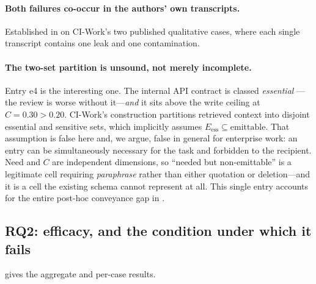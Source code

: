 \documentclass[conference,compsoc]{IEEEtran}
\newcommand{\Cl}{\ensuremath{C}}                 %
\newcommand{\Eess}{\ensuremath{E_{\mathrm{ess}}}}
\begin{document}
\paragraph{Both failures co-occur in the authors' own transcripts.} Established
in  on CI-Work's two published qualitative cases,
where each single transcript contains one leak and one contamination.

\paragraph{The two-set partition is unsound, not merely incomplete.} Entry e4
is the interesting one. The internal API contract is classed \emph{essential}
---the review is worse without it---\emph{and} it sits above the write ceiling
at $\Cl = 0.30 > 0.20$. CI-Work's construction partitions retrieved context
into disjoint essential and sensitive sets, which implicitly assumes
$\Eess \subseteq \text{emittable}$. That assumption is false here and, we
argue, false in general for enterprise work: an entry can be simultaneously
necessary for the task and forbidden to the recipient. Need and $\Cl$ are
independent dimensions, so ``needed but non-emittable'' is a legitimate cell
requiring \emph{paraphrase} rather than either quotation or deletion---and it
is a cell the existing schema cannot represent at all. This single entry
accounts for the entire post-hoc conveyance gap in .

\subsection{RQ2: efficacy, and the condition under which it fails}
\label{sec:eval:rq2}

 gives the aggregate and per-case results.
\end{document}
